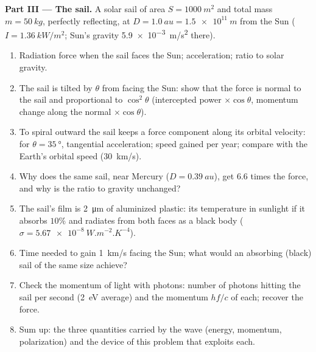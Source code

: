 \begin{problem}
\medskip
\noindent\textbf{Part III --- The sail.}
A solar sail of area $S = \qty{1000}{m^2}$ and total mass $m = \qty{50}{kg}$,
perfectly reflecting, at $D = \qty{1.0}{au} = \qty{1.5e11}{m}$ from the Sun
($I = \qty{1.36}{kW/m^2}$; Sun's gravity \qty{5.9e-3}{m/s^2} there).
\begin{enumerate}[resume]
  \item Radiation force when the sail faces the Sun; acceleration;
        ratio to solar gravity.
  \item The sail is tilted by $\theta$ from facing the Sun: show that the
        force is normal to the sail and proportional to $\cos^2\theta$
        (intercepted power $\times\cos\theta$, momentum change along the
        normal $\times\cos\theta$).
  \item To spiral outward the sail keeps a force component along its
        orbital velocity: for $\theta = \qty{35}{\degree}$, tangential
        acceleration; speed gained per year; compare with the Earth's
        orbital speed (\qty{30}{km/s}).
  \item Why does the same sail, near Mercury ($D = \qty{0.39}{au}$), get
        $6.6$ times the force, and why is the ratio to gravity
        unchanged?
  \item The sail's film is \qty{2}{\micro m} of aluminized plastic: its
        temperature in sunlight if it absorbs $10\%$ and radiates from
        both faces as a black body ($\sigma = \qty{5.67e-8}{W.m^{-2}.K^{-4}}$).
  \item Time needed to gain \qty{1}{km/s} facing the Sun; what would an
        absorbing (black) sail of the same size achieve?
  \item Check the momentum of light with photons: number of photons
        hitting the sail per second (\qty{2}{eV} average) and the
        momentum $hf/c$ of each; recover the force.
  \item Sum up: the three quantities carried by the wave (energy,
        momentum, polarization) and the device of this problem that
        exploits each.
\end{enumerate}
\end{problem}
